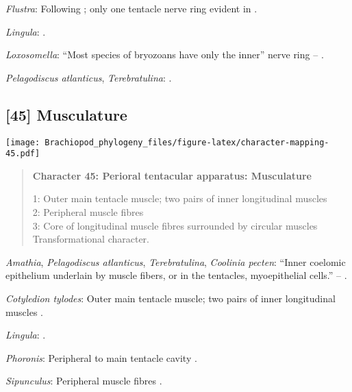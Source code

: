 \documentclass[openany]{book}
\theoremstyle{definition}
\theoremstyle{definition}
\theoremstyle{definition}
\theoremstyle{remark}
\begin{document}
\hypertarget{Flustra-coding-44}{}
\emph{Flustra}: Following \citet{Temereva2017Innervationof}; only one
tentacle nerve ring evident in \citet{Temereva2016Thenervous}.

\hypertarget{Lingula-coding-44}{}
\emph{Lingula}: \citet{Temereva2017Thefirst}.

\hypertarget{Loxosomella-coding-44}{}
\emph{Loxosomella}: ``Most species of bryozoans have only the inner''
nerve ring -- \citet{Temereva2017Innervationof}.

\hypertarget{Pelagodiscus_atlanticus-coding-44}{}
\emph{Pelagodiscus atlanticus}, \emph{Terebratulina}:
\citet{Temereva2017Innervationof}.

\subsection*{{[}45{]} Musculature}\label{musculature}

\texttt{[image: Brachiopod\_phylogeny\_files/figure-latex/character-mapping-45.pdf]}

\begin{quote}
\textbf{Character 45: Perioral tentacular apparatus: Musculature}

1: Outer main tentacle muscle; two pairs of inner longitudinal muscles\\
2: Peripheral muscle fibres\\
3: Core of longitudinal muscle fibres surrounded by circular muscles\\
Transformational character.
\end{quote}

\hypertarget{Amathia-coding-45}{}
\emph{Amathia}, \emph{Pelagodiscus atlanticus}, \emph{Terebratulina},
\emph{Coolinia pecten}: ``Inner coelomic epithelium underlain by muscle
fibers, or in the tentacles, myoepithelial cells.'' --
\citet{Williams1997Introduction}.

\hypertarget{Cotyledion_tylodes-coding-45}{}
\emph{Cotyledion tylodes}: Outer main tentacle muscle; two pairs of
inner longitudinal muscles \citep{Fuchs2006}.

\hypertarget{Lingula-coding-45}{}
\emph{Lingula}: \citep{Pardos1991}.

\hypertarget{Phoronis-coding-45}{}
\emph{Phoronis}: Peripheral to main tentacle cavity \citep{Pilger1982}.

\hypertarget{Sipunculus-coding-45}{}
\emph{Sipunculus}: Peripheral muscle fibres \citep{Hanson1949}.
\end{document}
